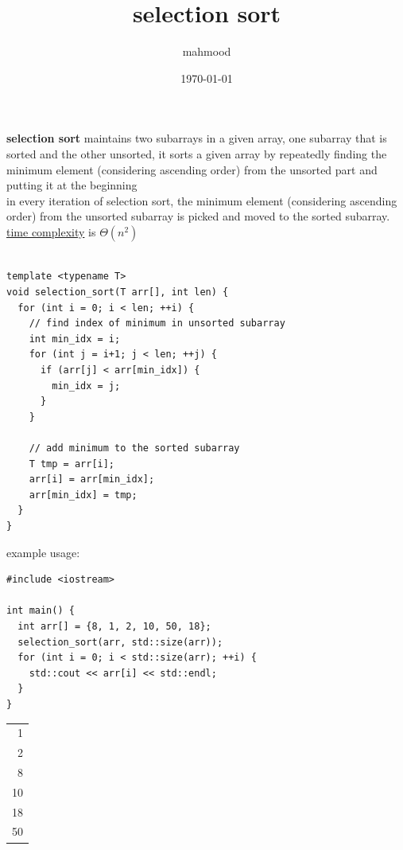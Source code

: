 \documentclass[a4paper,12pt]{article}
\author{mahmood}
\date{\today}
\title{selection sort}
\begin{document}
\maketitle
\textbf{selection sort} maintains two subarrays in a given array, one subarray that is sorted and the other unsorted, it sorts a given array by repeatedly finding the minimum element (considering ascending order) from the unsorted part and putting it at the beginning\\
in every iteration of selection sort, the minimum element (considering ascending order) from the unsorted subarray is picked and moved to the sorted subarray.\\
\href{20221130014441-time_complexity.org}{time complexity} is \(\Theta(n^2)\)\\
\\

\lstset{language=C++,label=orgc91e64f,caption= ,captionpos=b,numbers=none}
\begin{lstlisting}
template <typename T>
void selection_sort(T arr[], int len) {
  for (int i = 0; i < len; ++i) {
    // find index of minimum in unsorted subarray
    int min_idx = i;
    for (int j = i+1; j < len; ++j) {
      if (arr[j] < arr[min_idx]) {
        min_idx = j;
      }
    }

    // add minimum to the sorted subarray
    T tmp = arr[i];
    arr[i] = arr[min_idx];
    arr[min_idx] = tmp;
  }
}
\end{lstlisting}

example usage:\\

\lstset{language=C++,label= ,caption= ,captionpos=b,numbers=none}
\begin{lstlisting}
#include <iostream>

int main() {
  int arr[] = {8, 1, 2, 10, 50, 18};
  selection_sort(arr, std::size(arr));
  for (int i = 0; i < std::size(arr); ++i) {
    std::cout << arr[i] << std::endl;
  }
}
\end{lstlisting}

\begin{tabular}{r}
1\\
2\\
8\\
10\\
18\\
50\\
\end{tabular}
\end{document}
